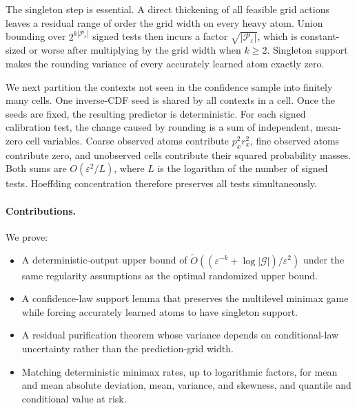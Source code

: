 \documentclass{article}
\theoremstyle{definition}
\theoremstyle{remark}
\newcommand{\1}{\mathbf 1}
\newcommand{\cG}{\mathcal G}
\newcommand{\cP}{\mathcal P}
\begin{document}
The singleton step is essential. A direct thickening of all feasible grid actions leaves a residual range of order the grid width on every heavy atom. Union bounding over $2^{k|\cP_\varepsilon|}$ signed tests then incurs a factor $\sqrt{|\cP_\varepsilon|}$, which is constant-sized or worse after multiplying by the grid width when $k\ge2$. Singleton support makes the rounding variance of every accurately learned atom exactly zero.

We next partition the contexts not seen in the confidence sample into finitely many cells. One inverse-CDF seed is shared by all contexts in a cell. Once the seeds are fixed, the resulting predictor is deterministic. For each signed calibration test, the change caused by rounding is a sum of independent, mean-zero cell variables. Coarse observed atoms contribute $p_x^2r_x^2$, fine observed atoms contribute zero, and unobserved cells contribute their squared probability masses. Both sums are $O(\varepsilon^2/L)$, where $L$ is the logarithm of the number of signed tests. Hoeffding concentration therefore preserves all tests simultaneously.

\paragraph{Contributions.} We prove:
\begin{itemize}
\item A deterministic-output upper bound of $\widetilde O((\varepsilon^{-k}+\log|\cG|)/\varepsilon^2)$ under the same regularity assumptions as the optimal randomized upper bound.
\item A confidence-law support lemma that preserves the multilevel minimax game while forcing accurately learned atoms to have singleton support.
\item A residual purification theorem whose variance depends on conditional-law uncertainty rather than the prediction-grid width.
\item Matching deterministic minimax rates, up to logarithmic factors, for mean and mean absolute deviation, mean, variance, and skewness, and quantile and conditional value at risk.
\end{itemize}
\end{document}
